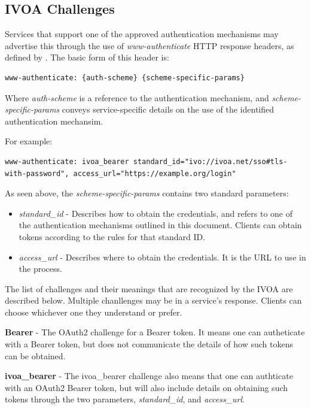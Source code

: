 \documentclass[11pt,a4paper]{ivoa}
\begin{document}
\subsection{IVOA Challenges}

Services that support one of the approved authentication mechanisms may
advertise this through the use of \emph{www-authenticate} HTTP response
headers, as defined by \citep{std:RFC7235}. The basic form of this
header is:

\begin{verbatim}
www-authenticate: {auth-scheme} {scheme-specific-params}
\end{verbatim}

Where \emph{auth-scheme} is a reference to the authentication mechanism,
and \emph{scheme-specific-params} conveys service-specific details on
the use of the identified authentication mechansim.

For example:

\begin{verbatim}
www-authenticate: ivoa_bearer standard_id="ivo://ivoa.net/sso#tls-with-password", access_url="https://example.org/login"
\end{verbatim}

As seen above, the \emph{scheme-specific-params} contains two standard
parameters:

\begin{itemize}
\item{\emph{standard\_id}} - Describes how to obtain the credentials,
and refers to one of the authentication mechanisms outlined in this
document. Clients can obtain tokens according to the rules for that
standard ID.
\item{\emph{access\_url}} - Describes where to obtain the credentials.
It is the URL to use in the process.
\end{itemize}

The list of challenges and their meanings that are recognized by the
IVOA are described below. Multiple chanllenges may be in a service's
response. Clients can choose whichever one they understand or prefer.

\textbf{Bearer} - The OAuth2 \citep{std:RFC6749} challenge for a Bearer
token. It means one can autheticate with a Bearer token, but does not
communicate the details of how such tokens can be obtained.

\textbf{ivoa\_bearer} - The ivoa\_bearer challenge also means that one can
authticate with an OAuth2 Bearer token, but will also include details on
obtaining such tokens through the two parameters, \emph{standard\_id},
and \emph{access\_url}.
\end{document}
